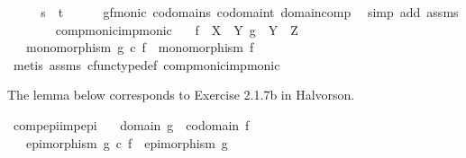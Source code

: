 \begin{isabellebody}
\ \ \isamarkupfalse%
\ \isamarkupfalse%
\ {\isachardoublequoteopen}s\ {\isacharequal}{\kern0pt}\ t{\isachardoublequoteclose}\isanewline
\ \ \ \ \isamarkupfalse%
\ gf{\isacharunderscore}{\kern0pt}monic\ codomain{\isacharunderscore}{\kern0pt}s\ codomain{\isacharunderscore}{\kern0pt}t\ domain{\isacharunderscore}{\kern0pt}comp\ \isamarkupfalse%
\ {\isacharparenleft}{\kern0pt}simp\ add{\isacharcolon}{\kern0pt}\ assms{\isacharparenright}{\kern0pt}\isanewline
{}\isamarkupfalse%
%
\endisatagproof
{\isafoldproof}%
%
\isadelimproof
\ \ \ \ \ \ \isanewline
%
\endisadelimproof
\isanewline
{}\isamarkupfalse%
\ comp{\isacharunderscore}{\kern0pt}monic{\isacharunderscore}{\kern0pt}imp{\isacharunderscore}{\kern0pt}monic{\isacharprime}{\kern0pt}{\isacharcolon}{\kern0pt}\isanewline
\ \ \ {\isachardoublequoteopen}f\ {\isacharcolon}{\kern0pt}\ X\ {\isasymrightarrow}\ Y{\isachardoublequoteclose}\ {\isachardoublequoteopen}g\ {\isacharcolon}{\kern0pt}\ Y\ {\isasymrightarrow}\ Z{\isachardoublequoteclose}\isanewline
\ \ \ {\isachardoublequoteopen}monomorphism\ {\isacharparenleft}{\kern0pt}g\ {\isasymcirc}\isactrlsub c\ f{\isacharparenright}{\kern0pt}\ {\isasymLongrightarrow}\ monomorphism\ f{\isachardoublequoteclose}\isanewline
%
\isadelimproof
\ \ %
\endisadelimproof
%
\isatagproof
{}\isamarkupfalse%
\ {\isacharparenleft}{\kern0pt}metis\ assms\ cfunc{\isacharunderscore}{\kern0pt}type{\isacharunderscore}{\kern0pt}def\ comp{\isacharunderscore}{\kern0pt}monic{\isacharunderscore}{\kern0pt}imp{\isacharunderscore}{\kern0pt}monic{\isacharparenright}{\kern0pt}%
\endisatagproof
{\isafoldproof}%
%
\isadelimproof
%
\endisadelimproof
%
\begin{isamarkuptext}%
The lemma below corresponds to Exercise 2.1.7b in Halvorson.%
\end{isamarkuptext}\isamarkuptrue%
\isamarkupfalse%
\ comp{\isacharunderscore}{\kern0pt}epi{\isacharunderscore}{\kern0pt}imp{\isacharunderscore}{\kern0pt}epi{\isacharcolon}{\kern0pt}\isanewline
\ \ \ {\isachardoublequoteopen}domain\ g\ {\isacharequal}{\kern0pt}\ codomain\ f{\isachardoublequoteclose}\isanewline
\ \ \ {\isachardoublequoteopen}epimorphism\ {\isacharparenleft}{\kern0pt}g\ {\isasymcirc}\isactrlsub c\ f{\isacharparenright}{\kern0pt}\ {\isasymLongrightarrow}\ epimorphism\ g{\isachardoublequoteclose}\isanewline
%
\isadelimproof
\ \ %
\endisadelimproof
%
\isatagproof
{}\isamarkupfalse%

\end{isabellebody}

